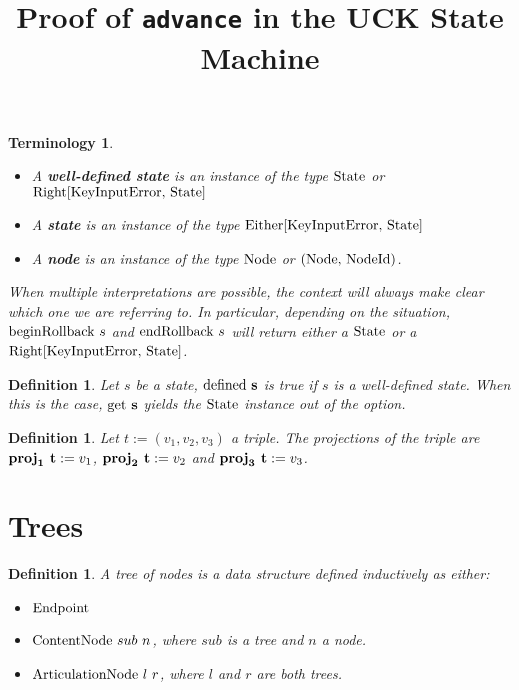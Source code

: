 \documentclass{article}
\title{\huge Proof of \texttt{advance} in the UCK State Machine}
\date{}
\author{}
\newtheorem{definition}[lemma]{Definition}
\newtheorem*{term}{Terminology}
\newcommand{\textfun}[1]{\textup{#1}}
\newcommand{\bolddef}[1]{\textbf{\ensuremath{\mathbf{#1}}}}
\newcommand{\nilNode}{\textfun{Endpoint}}
\newcommand{\contentNode}[2]{\textfun{ContentNode}\ #1\ #2}
\newcommand{\artNode}[2]{\textfun{ArticulationNode}\ #1\ #2}
\newcommand{\beginRb}[1]{\textfun{beginRollback}\ #1}
\newcommand{\enRb}[1]{\textfun{endRollback}\ #1}
\newcommand{\defined}[1]{\textfun{defined}\ #1}
\newcommand{\get}[1]{\textfun{get}\ #1}
\newcommand{\fst}[1]{\textfun{proj}_1\ #1}
\newcommand{\snd}[1]{\textfun{proj}_2\ #1}
\newcommand{\trd}[1]{\textfun{proj}_3\ #1}
\newcommand{\state}{\textfun{State}}
\begin{document}
\maketitle


\begin{term}\ 
    \begin{itemize}
        \item A \textbf{well-defined state} is an instance of the type $\state$ or $\textfun{Right[KeyInputError, \state]}$
        \item A \textbf{state} is an instance of the type $\textfun{Either[KeyInputError, \state]}$
        \item A \textbf{node} is an instance of the type $\textfun{Node}$ or $\textfun{(Node, NodeId)}$.
    \end{itemize}
    When multiple interpretations are possible, the context will always make clear which one we are referring to.
    In particular, depending on the situation, $\beginRb{s}$ and $\enRb{s}$ will return either a $\state$ or a $\textfun{Right[KeyInputError, \state]}$.
\end{term}

\begin{definition}
    Let $s$ be a state, \bolddef{\defined{s}} is true if $s$ is a well-defined state.
    When this is the case, \bolddef{\get{s}} yields the $\textfun{State}$ instance out of the option.
\end{definition}

\begin{definition}
    Let $t := (v_1, v_2, v_3)$ a triple. The projections of the triple are $\bolddef{\fst{t}} := v_1$, $\bolddef{\snd{t}} := v_2$ and $\bolddef{\trd{t}} := v_3$.
\end{definition}

















\section*{Trees}

\begin{definition}
    A tree of nodes is a data structure defined inductively as either:
    \begin{itemize}
        \item $\nilNode$
        \item $\contentNode{sub}{n}$, where $sub$ is a tree and $n$ a node.
        \item $\artNode{l}{r}$, where $l$ and $r$ are both trees.
    \end{itemize}
\end{definition}
\end{document}
